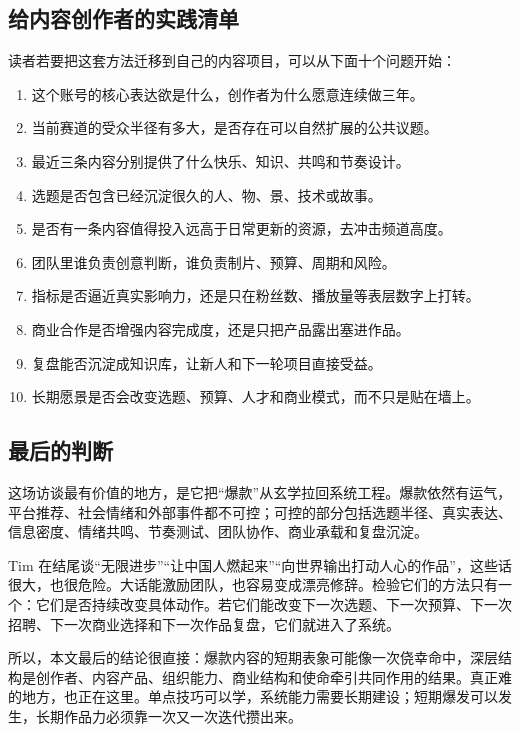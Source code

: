 \documentclass[a4paper]{article}
\begin{document}
\subsection{给内容创作者的实践清单}

读者若要把这套方法迁移到自己的内容项目，可以从下面十个问题开始：

\begin{enumerate}
  \item 这个账号的核心表达欲是什么，创作者为什么愿意连续做三年。
  \item 当前赛道的受众半径有多大，是否存在可以自然扩展的公共议题。
  \item 最近三条内容分别提供了什么快乐、知识、共鸣和节奏设计。
  \item 选题是否包含已经沉淀很久的人、物、景、技术或故事。
  \item 是否有一条内容值得投入远高于日常更新的资源，去冲击频道高度。
  \item 团队里谁负责创意判断，谁负责制片、预算、周期和风险。
  \item 指标是否逼近真实影响力，还是只在粉丝数、播放量等表层数字上打转。
  \item 商业合作是否增强内容完成度，还是只把产品露出塞进作品。
  \item 复盘能否沉淀成知识库，让新人和下一轮项目直接受益。
  \item 长期愿景是否会改变选题、预算、人才和商业模式，而不只是贴在墙上。
\end{enumerate}

\subsection{最后的判断}

这场访谈最有价值的地方，是它把“爆款”从玄学拉回系统工程。爆款依然有运气，平台推荐、社会情绪和外部事件都不可控；可控的部分包括选题半径、真实表达、信息密度、情绪共鸣、节奏测试、团队协作、商业承载和复盘沉淀。

Tim 在结尾谈“无限进步”“让中国人燃起来”“向世界输出打动人心的作品”，这些话很大，也很危险。大话能激励团队，也容易变成漂亮修辞。检验它们的方法只有一个：它们是否持续改变具体动作。若它们能改变下一次选题、下一次预算、下一次招聘、下一次商业选择和下一次作品复盘，它们就进入了系统。

所以，本文最后的结论很直接：爆款内容的短期表象可能像一次侥幸命中，深层结构是创作者、内容产品、组织能力、商业结构和使命牵引共同作用的结果。真正难的地方，也正在这里。单点技巧可以学，系统能力需要长期建设；短期爆发可以发生，长期作品力必须靠一次又一次迭代攒出来。
\end{document}
